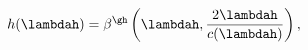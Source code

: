 \begin{equation}\label{eq:notation}
h(\lambdah)=\beta^{\gh}\left(\lambdah,\frac{2\lambdah}{c(\lambdah)}\right),
\end{equation}

